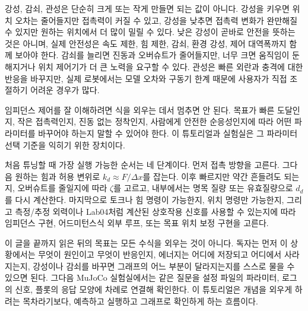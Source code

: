 강성, 감쇠, 관성은 단순히 크게 또는 작게 만들면 되는 값이 아니다.
강성을 키우면 위치 오차는 줄어들지만 접촉력이 커질 수 있고, 강성을 낮추면 접촉력 변화가 완만해질 수 있지만 원하는 위치에서 더 많이 밀릴 수 있다.
낮은 강성이 곧바로 안전을 뜻하는 것은 아니며, 실제 안전성은 속도 제한, 힘 제한, 감쇠, 환경 강성, 제어 대역폭까지 함께 보아야 한다.
감쇠를 늘리면 진동과 오버슈트가 줄어들지만, 너무 크면 움직임이 둔해지거나 위치 제어기가 더 큰 노력을 요구할 수 있다.
관성은 빠른 외란과 충격에 대한 반응을 바꾸지만, 실제 로봇에서는 모델 오차와 구동기 한계 때문에 사용자가 직접 조절하기 어려운 경우가 많다.

임피던스 제어를 잘 이해하려면 식을 외우는 데서 멈추면 안 된다.
목표가 빠른 도달인지, 작은 접촉력인지, 진동 없는 정착인지, 사람에게 안전한 순응성인지에 따라 어떤 파라미터를 바꾸어야 하는지 말할 수 있어야 한다.
이 튜토리얼과 실험실은 그 파라미터 선택 기준을 익히기 위한 장치이다.

처음 튜닝할 때 가장 실행 가능한 순서는 네 단계이다.
먼저 접촉 방향을 고른다.
그다음 원하는 힘과 허용 변위로 $k_d \approx F/\Delta x$를 잡는다.
이후 빠르지만 약간 흔들려도 되는지, 오버슈트를 줄일지에 따라 $\zeta$를 고르고, 내부에서는 명목 질량 또는 유효질량으로 $d_d$를 다시 계산한다.
마지막으로 토크나 힘 명령이 가능한지, 위치 명령만 가능한지, 그리고 측정/추정 외력이나 Lab04처럼 계산된 상호작용 신호를 사용할 수 있는지에 따라 임피던스 구현, 어드미턴스식 외부 루프, 또는 목표 위치 보정 구현을 고른다.

이 글을 끝까지 읽은 뒤의 목표는 모든 수식을 외우는 것이 아니다.
독자는 먼저 이 상황에서는 무엇이 원인이고 무엇이 반응인지, 에너지는 어디에 저장되고 어디에서 사라지는지, 강성이나 감쇠를 바꾸면 그래프의 어느 부분이 달라지는지를 스스로 물을 수 있으면 된다.
그다음 MuJoCo 실험실에서는 같은 질문을 설정 파일의 파라미터, 로그의 신호, 플롯의 응답 모양에 차례로 연결해 확인한다.
이 튜토리얼은 개념을 외우게 하려는 목차라기보다, 예측하고 실행하고 그래프로 확인하게 하는 흐름이다.

